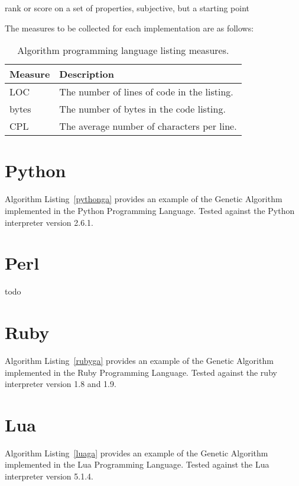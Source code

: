 \documentclass[a4paper, 11pt]{article}
\begin{document}
rank or score on a set of properties, subjective, but a starting point

The measures to be collected for each implementation are as follows:

\begin{table}[ht]
	\centering
		\begin{tabularx}{\textwidth}{lX}
		\toprule
		\textbf{Measure} & \textbf{Description} \\ 
		\toprule
		LOC & The number of lines of code in the listing. \\
		bytes & The number of bytes in the code listing. \\
		CPL & The average number of characters per line. \\
		\bottomrule
		\end{tabularx}	
	\caption{Algorithm programming language listing measures.}
	\label{tab:measures}
\end{table}


% 
% 
\section{Python}
\label{sec:python}
Algorithm Listing~\ref{pythonga} provides an example of the Genetic Algorithm implemented in the Python Programming Language. Tested against the Python interpreter version 2.6.1.



% 
% 
\section{Perl}
\label{sec:perl}
todo


% 
% 
\section{Ruby}
\label{sec:ruby}
Algorithm Listing~\ref{rubyga} provides an example of the Genetic Algorithm implemented in the Ruby Programming Language. Tested against the ruby interpreter version 1.8 and 1.9.




% 
% 
\section{Lua}
\label{sec:lua}
Algorithm Listing~\ref{luaga} provides an example of the Genetic Algorithm implemented in the Lua Programming Language. Tested against the Lua interpreter version 5.1.4.
\end{document}
